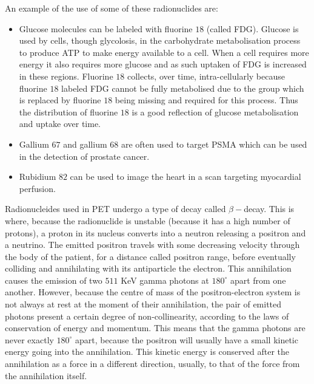             An example of the use of some of these radionuclides are:
            
            \begin{itemize}
                \item Glucose molecules can be labeled with fluorine $18$ (called \gls{FDG}). Glucose is used by cells, though glycolosis, in the carbohydrate metabolisation process to produce \gls{ATP} to make energy available to a cell. When a cell requires more energy it also requires more glucose and as such uptaken of \gls{FDG} is increased in these regions. Fluorine $18$ collects, over time, intra-cellularly because fluorine $18$ labeled \gls{FDG} cannot be fully metabolised due to the group which is replaced by fluorine $18$ being missing and required for this process. Thus the distribution of fluorine $18$ is a good reflection of glucose metabolisation and uptake over time.
                
                \item Gallium $67$ and gallium $68$ are often used to target \gls{PSMA} which can be used in the detection of prostate cancer.
                
                \item Rubidium $82$ can be used to image the heart in a scan targeting myocardial perfusion.
            \end{itemize}
            
            Radionucleides used in \gls{PET} undergo a type of decay called $\beta-$decay. This is where, because the radionuclide is unstable (because it has a high number of protons), a proton in its nucleus converts into a neutron releasing a positron and a neutrino. The emitted positron travels with some decreasing velocity through the body of the patient, for a distance called positron range, before eventually colliding and annihilating with its antiparticle the electron. This annihilation causes the emission of two $511$ \gls{KeV} gamma photons at $180^{\circ}$ apart from one another. However, because the centre of mass of the positron-electron system is not always at rest at the moment of their annihilation, the pair of emitted photons present a certain degree of non-collinearity, according to the laws of conservation of energy and momentum. This means that the gamma photons are never exactly $180^{\circ}$ apart, because the positron will usually have a small kinetic energy going into the annihilation. This kinetic energy is conserved after the annihilation as a force in a different direction, usually, to that of the force from the annihilation itself.
            
